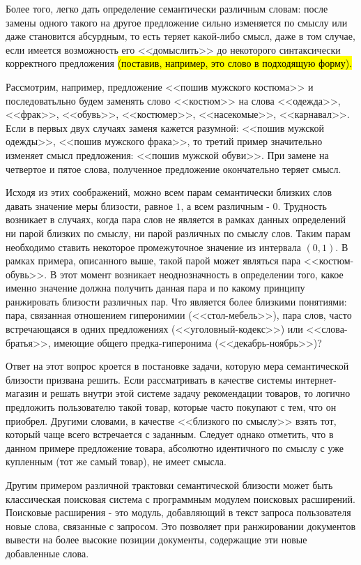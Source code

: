 Более того, легко дать определение семантически различным словам: после замены одного такого на другое предложение сильно изменяется по смыслу или даже становится абсурдным, то есть теряет какой-либо смысл, даже в том случае, если имеется возможность его <<домыслить>> до некоторого синтаксически корректного предложения \hl{(поставив, например, это слово в подходящую форму).}

Рассмотрим, например, предложение <<пошив мужского костюма>> и последоватьльно будем заменять слово <<костюм>> на слова <<одежда>>, <<фрак>>, <<обувь>>, <<костюмер>>, <<насекомые>>, <<карнавал>>. Если в первых двух случаях заменя кажется разумной: <<пошив мужской одежды>>, <<пошив мужского фрака>>, то третий пример значительно изменяет смысл предложения: <<пошив мужской обуви>>. При замене на четвертое и пятое слова, полученное предложение окончательно теряет смысл.

Исходя из этих соображений, можно всем парам семантически близких слов давать значение меры близости, равное $1$, а всем различным - $0$. Трудность возникает в случаях, когда пара слов не является в рамках данных определений ни парой близких по смыслу, ни парой различных по смыслу слов. Таким парам необходимо ставить некоторое промежуточное значение из интервала $(0, 1)$. В рамках примера, описанного выше, такой парой может являться пара <<костюм-обувь>>. В этот момент возникает неоднозначность в определении того, какое именно значение должна получить данная пара и по какому принципу ранжировать близости различных пар.  Что является более близкими понятиями: пара, связанная отношением гиперонимии (<<стол-мебель>>), пара слов, часто встречающаяся в одних предложениях (<<уголовный-кодекс>>) или <<слова-братья>>, имеющие общего предка-гиперонима (<<декабрь-ноябрь>>)?

Ответ на этот вопрос кроется в постановке задачи, которую мера семантической близости призвана решить. Если рассматривать в качестве системы интернет-магазин и решать внутри этой системе задачу рекомендации товаров, то логично предложить пользователю такой товар, которые часто покупают с тем, что он приобрел. Другими словами, в качестве <<близкого по смыслу>> взять тот, который чаще всего встречается с заданным. Следует однако отметить, что в данном примере предложение товара, абсолютно идентичного по смыслу с уже купленным (тот же самый товар), не имеет смысла.

Другим примером различной трактовки семантической близости может быть классическая поисковая система с программным модулем поисковых расширений. Поисковые расширения - это модуль, добавляющий в текст запроса пользователя новые слова, связанные с запросом. Это позволяет при ранжировании документов вывести на более высокие позиции документы, содержащие эти новые добавленные слова. 


